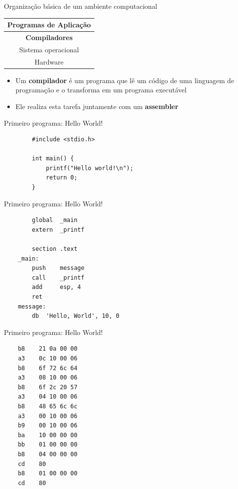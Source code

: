 \documentclass[handout]{beamer}
\begin{document}
\begin{frame}[fragile]{Organização básica de um ambiente computacional}

    \begin{center}
        \begin{tabular}{|c|} \hline
            Programas de Aplicação \\\hline
            \textbf{Compiladores} \\\hline
            Sistema operacional \\\hline
            Hardware \\\hline
        \end{tabular}
    \end{center}

    \begin{itemize}[<+->]
        \item Um {\bf compilador} é um programa que lê um código de uma linguagem de programação e o transforma em um programa executável
        \item Ele realiza esta tarefa juntamente com um {\bf assembler}
    \end{itemize}
\end{frame}

\begin{frame}[fragile]{Primeiro programa: Hello World!}

    \begin{verbatim}
        #include <stdio.h>

        int main() {
            printf("Hello world!\n");
            return 0;
        }
    \end{verbatim}
\end{frame}

\begin{frame}[fragile]{Primeiro programa: Hello World!}
    \begin{verbatim}
        global  _main
        extern  _printf
    
        section .text
    _main:
        push    message
        call    _printf
        add     esp, 4
        ret
    message:
        db  'Hello, World', 10, 0
    \end{verbatim}    
\end{frame}

\begin{frame}[fragile]{Primeiro programa: Hello World!}
    \begin{verbatim}
    b8    21 0a 00 00 
    a3    0c 10 00 06 
    b8    6f 72 6c 64 
    a3    08 10 00 06 
    b8    6f 2c 20 57 
    a3    04 10 00 06 
    b8    48 65 6c 6c 
    a3    00 10 00 06 
    b9    00 10 00 06 
    ba    10 00 00 00 
    bb    01 00 00 00 
    b8    04 00 00 00 
    cd    80          
    b8    01 00 00 00 
    cd    80          
    \end{verbatim}
\end{frame}
\end{document}

